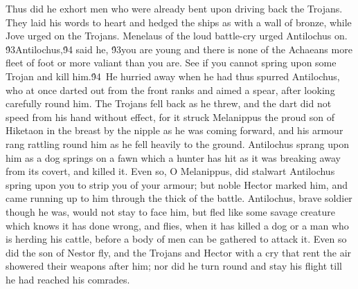 {Thus did he exhort men who were already bent upon driving back the Trojans. They laid his words to heart and hedged the ships as with a wall of bronze, while Jove urged on the Trojans. Menelaus of the loud battle-cry urged Antilochus on. \'93Antilochus,\'94 said he, \'93you are young and there is none of the Achaeans more fleet of foot or more valiant than you are. See if you cannot spring upon some Trojan and kill him.\'94\
He hurried away when he had thus spurred Antilochus, who at once darted out from the front ranks and aimed a spear, after looking carefully round him. The Trojans fell back as he threw, and the dart did not speed from his hand without effect, for it struck Melanippus the proud son of Hiketaon in the breast by the nipple as he was coming forward, and his armour rang rattling round him as he fell heavily to the ground. Antilochus sprang upon him as a dog springs on a fawn which a hunter has hit as it was breaking away from its covert, and killed it. Even so, O Melanippus, did stalwart Antilochus spring upon you to strip you of your armour; but noble Hector marked him, and came running up to him through the thick of the battle. Antilochus, brave soldier though he was, would not stay to face him, but fled like some savage creature which knows it has done wrong, and flies, when it has killed a dog or a man who is herding his cattle, before a body of men can be gathered to attack it. Even so did the son of Nestor fly, and the Trojans and Hector with a cry that rent the air showered their weapons after him; nor did he turn round and stay his flight till he had reached his comrades.\
}
